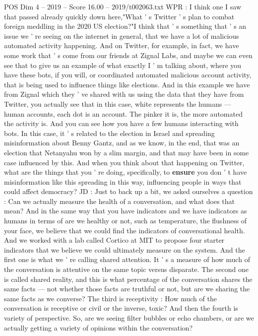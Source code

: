 \begin{textsample}{POS Dim 4 – 2019 – Score 16.00 – 2019/t002063.txt}
WPR : I think one I saw that passed already quickly down here,"What ' s Twitter ' s plan to combat foreign meddling in the 2020 US election?"I think that ' s something that ' s an issue we ' re seeing on the internet in general, that we have a lot of malicious automated activity happening.
And on Twitter, for example, in fact, we have some work that ' s come from our friends at Zignal Labs, and maybe we can even see that to give us an example of what exactly I ' m talking about, where you have these bots, if you will, or coordinated automated malicious account activity, that is being used to influence things like elections.
And in this example we have from Zignal which they ' ve shared with us using the data that they have from Twitter, you actually see that in this case, white represents the humans — human accounts, each dot is an account.
The pinker it is, the more automated the activity is.
And you can see how you have a few humans interacting with bots.
In this case, it ' s related to the election in Israel and spreading misinformation about Benny Gantz, and as we know, in the end, that was an election that Netanyahu won by a slim margin, and that may have been in some case influenced by this.
And when you think about that happening on Twitter, what are the things that you ' re doing, specifically, to \textbf{ensure} you don ' t have misinformation like this spreading in this way, influencing people in ways that could affect democracy?
JD : Just to back up a bit, we asked ourselves a question : Can we actually measure the health of a conversation, and what does that mean?
And in the same way that you have indicators and we have indicators as humans in terms of are we healthy or not, such as temperature, the flushness of your face, we believe that we could find the indicators of conversational health.
And we worked with a lab called Cortico at MIT to propose four starter indicators that we believe we could ultimately measure on the system.
And the first one is what we ' re calling shared attention.
It ' s a measure of how much of the conversation is attentive on the same topic versus disparate.
The second one is called shared reality, and this is what percentage of the conversation shares the same facts — not whether those facts are truthful or not, but are we sharing the same facts as we converse?
The third is receptivity : How much of the conversation is receptive or civil or the inverse, toxic?
And then the fourth is variety of perspective.
So, are we seeing filter bubbles or echo chambers, or are we actually getting a variety of opinions within the conversation?

\end{textsample}
